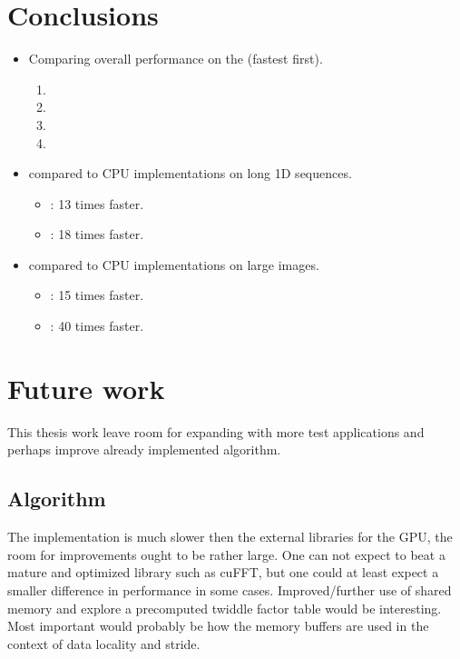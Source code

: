 \section{Conclusions}

\begin{itemize}
	\item Comparing overall performance on the {\NVCARD} (fastest first).
	\begin{enumerate}	
		\item {\CU}
		\item {\DX}
		\item {\GL}
		\item {\OCL}
	\end{enumerate}
	\item {\CU} compared to CPU implementations on long 1D sequences.
	\begin{itemize}
		\item {\OMP}: 13 times faster.
		\item {\CPP}: 18 times faster.
	\end{itemize}
	\item {\CU} compared to CPU implementations on large images.
	\begin{itemize}
		\item {\OMP}: 15 times faster.
		\item {\CPP}: 40 times faster.
	\end{itemize}
\end{itemize}

\section{Future work}

This thesis work leave room for expanding with more test applications and perhaps improve already implemented algorithm.

\subsection{Algorithm}

The implementation is much slower then the external libraries for the GPU, the room for improvements ought to be rather large. One can not expect to beat a mature and optimized library such as cuFFT, but one could at least expect a smaller difference in performance in some cases. Improved/further use of shared memory and explore a precomputed twiddle factor table would be interesting. Most important would probably be how the memory buffers are used in the context of data locality and stride.

